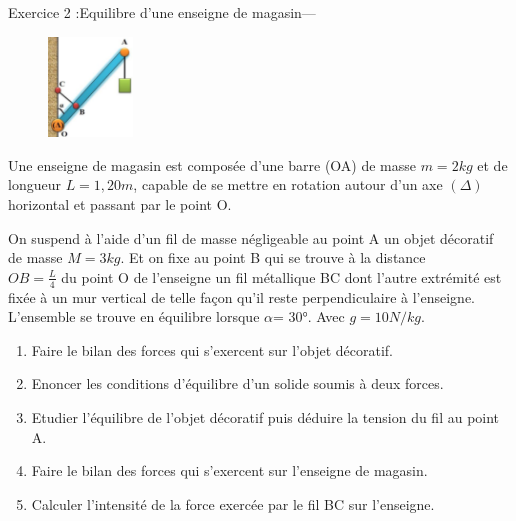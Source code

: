 \documentclass[12pt, french]{article}
\begin{document}
\begin{Box2}{Exercice 2 :Equilibre d'une enseigne de magasin---}

	\begin{figure}
  \begin{center}
	  \includegraphics[width=0.2\textwidth]{./img/ex01.png}
  \end{center}
\end{figure}

Une enseigne de magasin est composée d'une barre (OA) de masse
$m=2kg$ et de longueur $L=1,20m$, capable de se mettre en rotation autour
d'un axe $(\Delta)$ horizontal et passant par le point O.

On suspend à l'aide d'un fil de masse négligeable au point A un objet
décoratif \\de masse $M = 3kg$. Et on fixe au point B qui se trouve à la
distance \\$OB =\frac{L}{4}$ du point O de l'enseigne un fil métallique BC dont
l'autre extrémité est \\fixée à un mur vertical de telle façon qu'il reste
perpendiculaire à l'enseigne.\\ L'ensemble se trouve en équilibre lorsque
$\alpha$= 30°. Avec $g = 10N/kg$.
\begin{enumerate}

	\item Faire le bilan des forces qui s’exercent sur l'objet décoratif.
	\item  Enoncer les conditions d’équilibre d’un solide soumis à deux forces.
	\item  Etudier l'équilibre de l'objet décoratif puis déduire la tension du fil au point A.
	\item  Faire le bilan des forces qui s’exercent sur l'enseigne de magasin.
	\item  Calculer l'intensité de la force exercée par le fil BC sur l'enseigne.
\end{enumerate}
\end{Box2}
\end{document}
